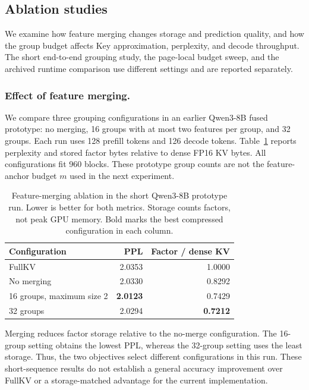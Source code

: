 \documentclass{article} %
\begin{document}
\subsection{Ablation studies}

We examine how feature merging changes storage and prediction quality,
and how the group budget affects Key approximation, perplexity, and decode
throughput. The short end-to-end grouping study, the page-local budget sweep,
and the archived runtime comparison use different settings and are reported
separately.
\subsubsection{Effect of feature merging.}
We compare three grouping configurations in an earlier Qwen3-8B fused
prototype: no merging, 16 groups with at most two features per group, and
32 groups. Each run uses 128 prefill tokens and 126 decode tokens.
Table~\ref{tab:ablation-merging} reports perplexity and stored factor bytes
relative to dense FP16 KV bytes. All configurations fit 960 blocks.
These prototype group counts are not the feature-anchor budget $m$
used in the next experiment.

\begin{table}[H]
\centering
\caption{Feature-merging ablation in the short Qwen3-8B prototype run.
Lower is better for both metrics. Storage counts factors, not peak GPU
memory. Bold marks the best compressed configuration in each column.}
\label{tab:ablation-merging}
\small
\setlength{\tabcolsep}{8pt}
\begin{tabular}{lrr}
\toprule
Configuration & PPL & Factor / dense KV \\
\midrule
FullKV & 2.0353 & 1.0000 \\
\midrule
No merging & 2.0330 & 0.8292 \\
16 groups, maximum size 2 & \textbf{2.0123} & 0.7429 \\
32 groups & 2.0294 & \textbf{0.7212} \\
\bottomrule
\end{tabular}
\end{table}

Merging reduces factor storage relative to the no-merge configuration.
The 16-group setting obtains the lowest PPL, whereas the 32-group setting
uses the least storage. Thus, the two objectives select different
configurations in this run. These short-sequence results do not establish
a general accuracy improvement over FullKV or a storage-matched advantage
for the current implementation.
\fi
\end{document}
